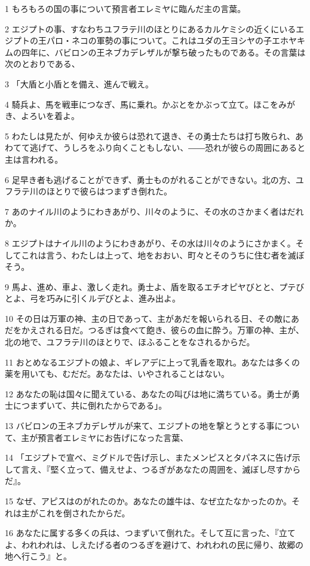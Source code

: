 \par 1 もろもろの国の事について預言者エレミヤに臨んだ主の言葉。
\par 2 エジプトの事、すなわちユフラテ川のほとりにあるカルケミシの近くにいるエジプトの王パロ・ネコの軍勢の事について。これはユダの王ヨシヤの子エホヤキムの四年に、バビロンの王ネブカデレザルが撃ち破ったものである。その言葉は次のとおりである、
\par 3 「大盾と小盾とを備え、進んで戦え。
\par 4 騎兵よ、馬を戦車につなぎ、馬に乗れ。かぶとをかぶって立て。ほこをみがき、よろいを着よ。
\par 5 わたしは見たが、何ゆえか彼らは恐れて退き、その勇士たちは打ち敗られ、あわてて逃げて、うしろをふり向くこともしない、――恐れが彼らの周囲にあると主は言われる。
\par 6 足早き者も逃げることができず、勇士ものがれることができない。北の方、ユフラテ川のほとりで彼らはつまずき倒れた。
\par 7 あのナイル川のようにわきあがり、川々のように、その水のさかまく者はだれか。
\par 8 エジプトはナイル川のようにわきあがり、その水は川々のようにさかまく。そしてこれは言う、わたしは上って、地をおおい、町々とそのうちに住む者を滅ぼそう。
\par 9 馬よ、進め、車よ、激しく走れ。勇士よ、盾を取るエチオピヤびとと、プテびとよ、弓を巧みに引くルデびとよ、進み出よ。
\par 10 その日は万軍の神、主の日であって、主があだを報いられる日、その敵にあだをかえされる日だ。つるぎは食べて飽き、彼らの血に酔う。万軍の神、主が、北の地で、ユフラテ川のほとりで、ほふることをなされるからだ。
\par 11 おとめなるエジプトの娘よ、ギレアデに上って乳香を取れ。あなたは多くの薬を用いても、むだだ。あなたは、いやされることはない。
\par 12 あなたの恥は国々に聞えている、あなたの叫びは地に満ちている。勇士が勇士につまずいて、共に倒れたからである」。
\par 13 バビロンの王ネブカデレザルが来て、エジプトの地を撃とうとする事について、主が預言者エレミヤにお告げになった言葉、
\par 14 「エジプトで宣べ、ミグドルで告げ示し、またメンピスとタパネスに告げ示して言え、『堅く立って、備えせよ、つるぎがあなたの周囲を、滅ぼし尽すからだ』。
\par 15 なぜ、アピスはのがれたのか。あなたの雄牛は、なぜ立たなかったのか。それは主がこれを倒されたからだ。
\par 16 あなたに属する多くの兵は、つまずいて倒れた。そして互に言った、『立てよ、われわれは、しえたげる者のつるぎを避けて、われわれの民に帰り、故郷の地へ行こう』と。
